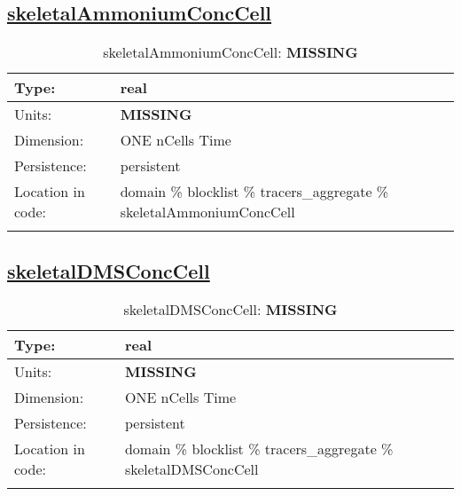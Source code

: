 \subsection[skeletalAmmoniumConcCell]{\hyperref[sec:var_tab_tracers_aggregate]{skeletalAmmoniumConcCell}}
\label{subsec:var_sec_tracers_aggregate_skeletalAmmoniumConcCell}
\begin{center}
\begin{longtable}{| p{2.0in} | p{4.0in} |}
        \hline 
        Type: & real \\
        \hline 
        Units: & {\bf \color{red} MISSING} \\
        \hline 
        Dimension: & ONE nCells Time \\
        \hline 
        Persistence: & persistent \\
        \hline 
         Location in code: & domain \% blocklist \% tracers\_aggregate \% skeletalAmmoniumConcCell \\
         \hline 
    \caption{skeletalAmmoniumConcCell: {\bf \color{red} MISSING}}
\end{longtable}
\end{center}
\subsection[skeletalDMSConcCell]{\hyperref[sec:var_tab_tracers_aggregate]{skeletalDMSConcCell}}
\label{subsec:var_sec_tracers_aggregate_skeletalDMSConcCell}
\begin{center}
\begin{longtable}{| p{2.0in} | p{4.0in} |}
        \hline 
        Type: & real \\
        \hline 
        Units: & {\bf \color{red} MISSING} \\
        \hline 
        Dimension: & ONE nCells Time \\
        \hline 
        Persistence: & persistent \\
        \hline 
         Location in code: & domain \% blocklist \% tracers\_aggregate \% skeletalDMSConcCell \\
         \hline 
    \caption{skeletalDMSConcCell: {\bf \color{red} MISSING}}
\end{longtable}
\end{center}
